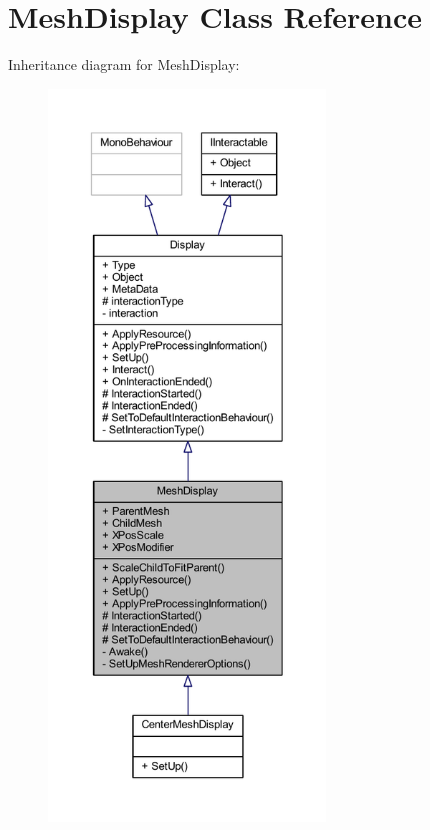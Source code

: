 \hypertarget{class_mesh_display}{}\section{Mesh\+Display Class Reference}
\label{class_mesh_display}


Inheritance diagram for Mesh\+Display\+:
\nopagebreak
\begin{figure}[H]
\begin{center}
\leavevmode
\includegraphics[height=550pt]{class_mesh_display__inherit__graph}
\end{center}
\end{figure}


